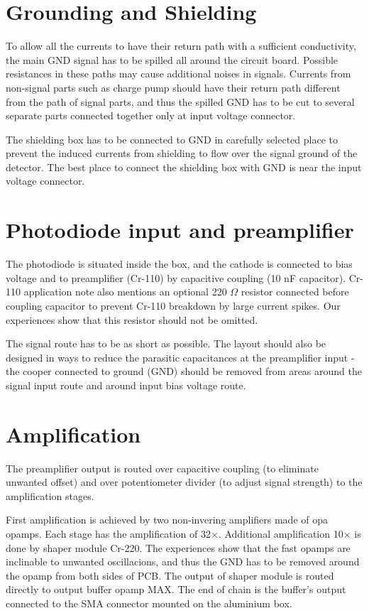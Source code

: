 \section{Grounding and Shielding}
To allow all the currents to have their return path with a sufficient conductivity, the main GND signal has to be spilled all around the circuit board. Possible resistances in these paths may cause additional noises in signals. Currents from non-signal parts such as charge pump should have their return path different from the path of signal parts, and thus the spilled GND has to be cut to several separate parts connected together only at input voltage connector.

\par
The shielding box has to be connected to GND in carefully selected place to prevent the induced currents from shielding to flow over the signal ground of the detector. The best place to connect the shielding box with GND is near the input voltage connector.


\section{Photodiode input and preamplifier}
The photodiode is situated inside the box, and the cathode is connected to bias voltage and to preamplifier (Cr-110) by capacitive coupling (10 nF capacitor). Cr-110 application note also mentions an optional 220 $\Omega$ resistor connected before coupling capacitor to prevent Cr-110 breakdown by large current spikes. Our experiences show that this resistor should not be omitted.

\par
The signal route has to be as short as possible. The layout should also be designed in ways to reduce the parasitic capacitances at the preamplifier input - the cooper connected to ground (GND) should be removed from areas around the signal input route and around input bias voltage route. 

\section{Amplification}
The preamplifier output is routed over capacitive coupling (to eliminate unwanted offset) and over potentiometer divider (to adjust signal strength) to the amplification stages. 

First amplification is achieved by two non-invering amplifiers made of opa opamps. Each stage has the amplification of 32$\times$. Additional amplification 10$\times$ is done by shaper module Cr-220. The experiences show that the fast opamps are inclinable to unwanted oscillacions, and thus the GND has to be removed around the opamp from both sides of PCB. The output of shaper module is routed directly to output buffer opamp MAX. The end of chain is the buffer's output connected to the SMA connector mounted on the aluminium box.


